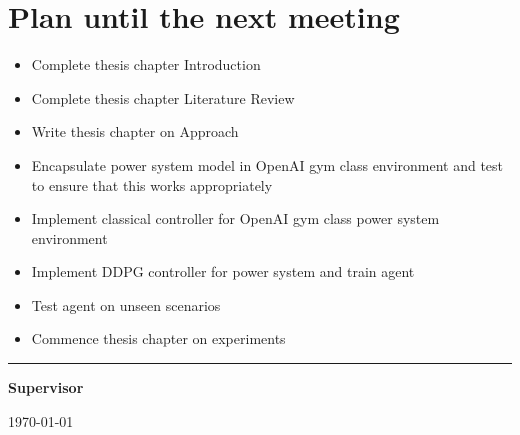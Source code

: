 \documentclass[12pt]{article}
\begin{document}
	\section{Plan until the next meeting}
	\begin{itemize}
		\item Complete thesis chapter Introduction
		\item Complete thesis chapter Literature Review
		\item Write thesis chapter on Approach
		\item Encapsulate power system model in OpenAI gym class environment and test to ensure that this works appropriately
		\item Implement classical controller for OpenAI gym class power system environment
		\item Implement DDPG controller for power system and train agent
		\item Test agent on unseen scenarios
		\item Commence thesis chapter on experiments
	\end{itemize}
	
	\par
	\vspace{\fill}%
	\noindent\rule{0.4\linewidth}{0.5pt}%
	\vspace{1em}%
	\par
	\noindent\textbf{Supervisor}\vspace{1em}%
	\par
	\noindent\today
\end{document}
